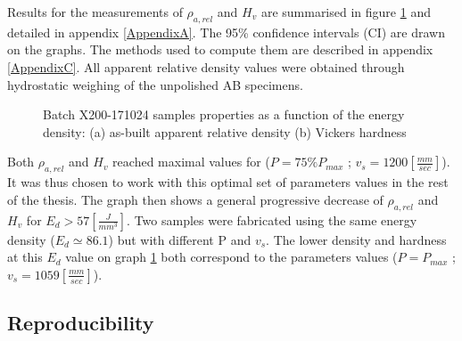 Results for the measurements of $\rho_{a,rel}$ and $H_v$ are summarised in figure \ref{fig:HD2-171024} and detailed in appendix \ref{AppendixA}. The 95\% confidence intervals (CI) are drawn on the graphs. The methods used to compute them are described in appendix \ref{AppendixC}. All apparent relative density values were obtained through hydrostatic weighing of the unpolished AB specimens.\\

\begin{figure}[ht]
\centering
\noindent{}
\decoRule
\caption[Batch X200-171024 samples properties as a function of the energy density: (a) as-built apparent relative density (b) Vickers hardness]{Batch X200-171024 samples properties as a function of the energy density: (a) as-built apparent relative density (b) Vickers hardness}
\label{fig:HD2-171024}
\end{figure} 

Both $\rho_{a,rel}$ and $H_v$ reached maximal values for ($P=75\% P_{max}$ ; $v_s=1200 [\frac{mm}{sec}]$). It was thus chosen to work with this optimal set of parameters values in the rest of the thesis. The graph then shows a general progressive decrease of  $\rho_{a,rel}$ and $H_v$ for $E_d>57 [\frac{J}{mm^3}]$. Two samples were fabricated using the same energy density ($E_d \simeq 86.1$) but with different P and $v_s$. The lower density and hardness at this $E_d$ value on graph \ref{fig:HD2-171024} both correspond to the parameters values ($P=P_{max}$ ; $v_s=1059 [\frac{mm}{sec}]$).


\subsection{Reproducibility}
\label{RReprod}
